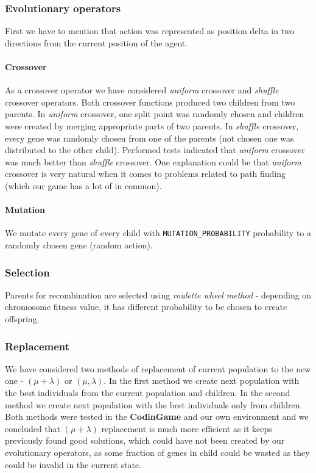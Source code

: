 \documentclass[11pt]{article}
\begin{document}
    \subsubsection*{Evolutionary operators}
    First we have to mention that action was represented as position delta in two directions from the current position of the agent.
    
    \paragraph{Crossover} As a crossover operator we have considered \textit{uniform} crossover and \textit{shuffle} crossover operators. Both crossover functions produced two children from two parents. In \textit{uniform} crossover, one split point was randomly chosen and children were created by merging appropriate parts of two parents. In \textit{shuffle} crossover, every gene was randomly chosen from one of the parents (not chosen one was distributed to the other child). Performed tests indicated that \textit{uniform} crossover was much better than \textit{shuffle} crossover. One explanation could be that \textit{uniform} crossover is very natural when it comes to problems related to path finding (which our game has a lot of in common).
    
    \paragraph{Mutation} We mutate every gene of every child with \texttt{MUTATION\_PROBABILITY} probability to a randomly chosen gene (random action).
    
    \subsubsection*{Selection}
    Parents for recombination are selected using \textit{roulette wheel method} - depending on chromosome fitness value, it has different probability to be chosen to create offspring.
    
    \subsubsection*{Replacement}
    We have considered two methods of replacement of current population to the new one - $(\mu+\lambda)$ or $(\mu,\lambda)$. In the first method we create next population with the best individuals from the current population and children. In the second method we create next population with the best individuals only from children. Both methods were tested in the \textbf{CodinGame} and our own environment and we concluded that $(\mu+\lambda)$ replacement is much more efficient as it keeps previously found good solutions, which could have not been created by our evolutionary operators, as some fraction of genes in child could be wasted as they could be invalid in the current state.
    
\end{document}
